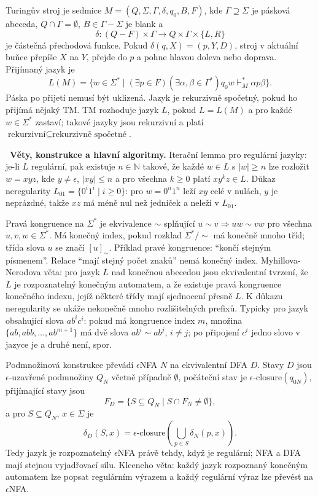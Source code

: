 \begin{odpoved}
Turingův stroj je sedmice $M=(Q,\Sigma,\Gamma,\delta,q_0,B,F)$, kde
$\Gamma\supseteq\Sigma$ je pásková abeceda, $Q\cap\Gamma=\emptyset$, $B\in\Gamma-\Sigma$
je blank a
\[
\delta:(Q-F)\times\Gamma\to Q\times\Gamma\times\{L,R\}
\]
je částečná přechodová funkce. Pokud $\delta(q,X)=(p,Y,D)$, stroj v aktuální buňce
přepíše $X$ na $Y$, přejde do $p$ a pohne hlavou doleva nebo doprava. Přijímaný jazyk je
\[
L(M)=\{w\in\Sigma^*\mid(\exists p\in F)(\exists\alpha,\beta\in\Gamma^*)
q_0w\vdash_M^*\alpha p\beta\}.
\]
Páska po přijetí nemusí být uklizená. Jazyk je rekurzivně spočetný, pokud ho přijímá
nějaký TM. TM rozhoduje jazyk $L$, pokud $L=L(M)$ a pro každé $w\in\Sigma^*$ zastaví;
takové jazyky jsou rekurzivní a platí $\text{rekurzivní}\subseteq\text{rekurzivně spočetné}$.

\noindent{}\ \textbf{Věty, konstrukce a hlavní algoritmy.}
Iterační lemma pro regulární jazyky: je-li $L$ regulární, pak existuje
$n\in\mathbb N$ takové, že každé $w\in L$ s $|w|\ge n$ lze rozložit
$w=xyz$, kde $y\ne\epsilon$, $|xy|\le n$ a pro všechna $k\ge0$ platí
$xy^kz\in L$. Důkaz neregularity $L_{01}=\{0^i1^i\mid i\ge0\}$: pro
$w=0^n1^n$ leží $xy$ celé v nulách, $y$ je neprázdné, takže $xz$ má méně nul než
jedniček a neleží v $L_{01}$.

Pravá kongruence na $\Sigma^*$ je ekvivalence $\sim$ splňující
$u\sim v\Rightarrow uw\sim vw$ pro všechna $u,v,w\in\Sigma^*$. Má konečný index,
pokud rozklad $\Sigma^*/\sim$ má konečně mnoho tříd; třída slova $u$ se značí
$[u]_\sim$. Příklad pravé kongruence: ``končí stejným písmenem''. Relace ``mají
stejný počet znaků'' nemá konečný index. Myhillova-Nerodova věta: pro jazyk $L$ nad
konečnou abecedou jsou ekvivalentní tvrzení, že $L$ je rozpoznatelný konečným
automatem, a že existuje pravá kongruence konečného indexu, jejíž některé třídy mají
sjednocení přesně $L$. K důkazu neregularity se ukáže nekonečně mnoho rozlišitelných
prefixů. Typicky pro jazyk obsahující slova $ab^ic^i$: pokud má kongruence index $m$,
množina $\{ab,abb,\ldots,ab^{m+1}\}$ má dvě slova $ab^i\sim ab^j$, $i\ne j$; po
připojení $c^i$ jedno slovo v jazyce je a druhé není, spor.

Podmnožinová konstrukce převádí $\epsilon$NFA $N$ na ekvivalentní DFA $D$. Stavy $D$
jsou $\epsilon$-uzavřené podmnožiny $Q_N$ včetně případně $\emptyset$,
počáteční stav je $\epsilon\text{-closure}(q_{0N})$, přijímající stavy jsou
\[
F_D=\{S\subseteq Q_N\mid S\cap F_N\ne\emptyset\},
\]
a pro $S\subseteq Q_N$, $x\in\Sigma$ je
\[
\delta_D(S,x)=\epsilon\text{-closure}\left(\bigcup_{p\in S}\delta_N(p,x)\right).
\]
Tedy jazyk je rozpoznatelný $\epsilon$NFA právě tehdy, když je regulární; NFA a DFA
mají stejnou vyjadřovací sílu. Kleeneho věta: každý jazyk rozpoznaný konečným automatem
lze popsat regulárním výrazem a každý regulární výraz lze převést na $\epsilon$NFA.


\end{odpoved}
